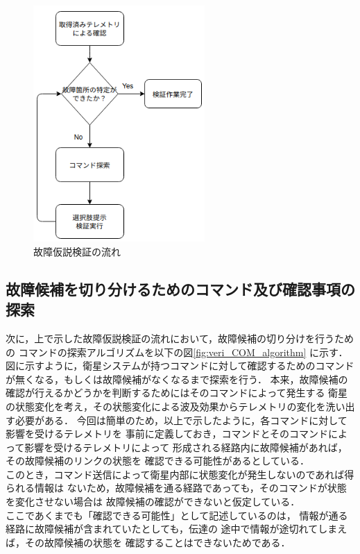 \documentclass[11pt]{jsreport}
\begin{document}
\begin{figure}[H]
   \centering
      \includegraphics[height=9.0cm]{figure/whole_fault_diagnosis_flow.png}
      \caption{故障仮説検証の流れ}
      \label{fig:whole_fault_flow}
\end{figure}

\newpage
\subsection{故障候補を切り分けるためのコマンド及び確認事項の探索}
次に，上で示した故障仮説検証の流れにおいて，故障候補の切り分けを行うための
コマンドの探索アルゴリズムを以下の図\ref{fig:veri_COM_algorithm}
に示す．
図に示すように，衛星システムが持つコマンドに対して確認するためのコマンド
が無くなる，もしくは故障候補がなくなるまで探索を行う．
本来，故障候補の確認が行えるかどうかを判断するためにはそのコマンドによって発生する
衛星の状態変化を考え，その状態変化による波及効果からテレメトリの変化を洗い出す必要がある．
今回は簡単のため，以上で示したように，各コマンドに対して影響を受けるテレメトリを
事前に定義しておき，コマンドとそのコマンドによって影響を受けるテレメトリによって
形成される経路内に故障候補があれば，その故障候補のリンクの状態を
確認できる可能性があるとしている．\\
このとき，コマンド送信によって衛星内部に状態変化が発生しないのであれば得られる情報は
ないため，故障候補を通る経路であっても，そのコマンドが状態を変化させない場合は
故障候補の確認ができないと仮定している．\\
ここであくまでも「確認できる可能性」として記述しているのは，
情報が通る経路に故障候補が含まれていたとしても，伝達の
途中で情報が途切れてしまえば，その故障候補の状態を
確認することはできないためである．
\end{document}
